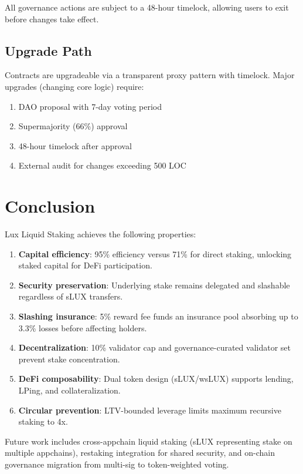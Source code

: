 \documentclass[11pt,a4paper]{article}
\begin{document}
All governance actions are subject to a 48-hour timelock, allowing users to exit before changes take effect.

\subsection{Upgrade Path}

Contracts are upgradeable via a transparent proxy pattern with timelock. Major upgrades (changing core logic) require:
\begin{enumerate}
    \item DAO proposal with 7-day voting period
    \item Supermajority (66\%) approval
    \item 48-hour timelock after approval
    \item External audit for changes exceeding 500 LOC
\end{enumerate}

\section{Conclusion}\label{sec:conclusion}

Lux Liquid Staking achieves the following properties:

\begin{enumerate}
    \item \textbf{Capital efficiency}: 95\% efficiency versus 71\% for direct staking, unlocking staked capital for DeFi participation.
    \item \textbf{Security preservation}: Underlying stake remains delegated and slashable regardless of sLUX transfers.
    \item \textbf{Slashing insurance}: 5\% reward fee funds an insurance pool absorbing up to 3.3\% losses before affecting holders.
    \item \textbf{Decentralization}: 10\% validator cap and governance-curated validator set prevent stake concentration.
    \item \textbf{DeFi composability}: Dual token design (sLUX/wsLUX) supports lending, LPing, and collateralization.
    \item \textbf{Circular prevention}: LTV-bounded leverage limits maximum recursive staking to 4x.
\end{enumerate}

Future work includes cross-appchain liquid staking (sLUX representing stake on multiple appchains), restaking integration for shared security, and on-chain governance migration from multi-sig to token-weighted voting.
\end{document}

